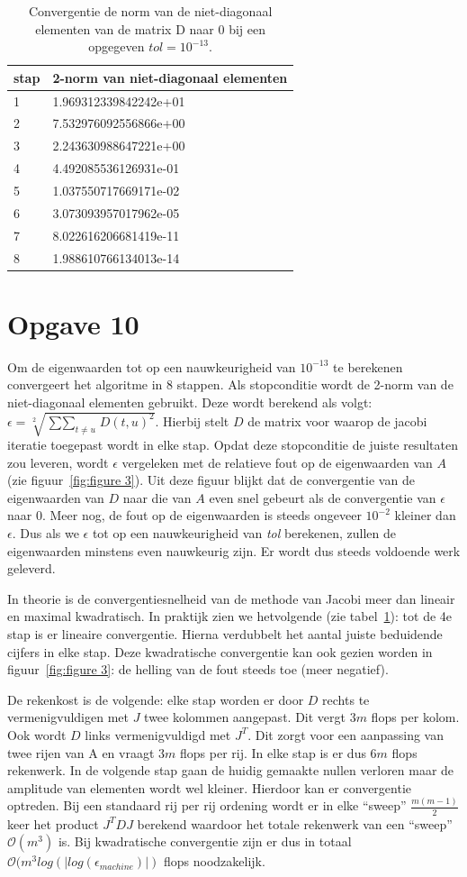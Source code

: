 \documentclass[a4paper]{article}
\newcommand{\opgave}[1]{\section*{Opgave #1}}
\begin{document}
\begin{table}[h]
\begin{tabular}{|l|l|}
\hline
stap & 2-norm van niet-diagonaal elementen\\
\hline
1 & 1.969312339842242e+01\\
2 & 7.532976092556866e+00\\
3 & 2.243630988647221e+00\\
4 & 4.492085536126931e-01\\
5 & 1.037550717669171e-02\\
6 & 3.073093957017962e-05\\
7 & 8.022616206681419e-11\\
8 & 1.988610766134013e-14\\
\hline
\end{tabular}
\caption{Convergentie de norm van de niet-diagonaal elementen van de matrix D naar 0 bij een opgegeven $tol =10^{-13}$.}
\label{table:tab2}
\end{table}
\newpage
\opgave{10}
Om de eigenwaarden tot op een nauwkeurigheid van $10^{-13}$ te berekenen convergeert het algoritme in 8 stappen. Als stopconditie wordt de 2-norm van de niet-diagonaal elementen gebruikt. Deze wordt berekend als volgt: $\epsilon = \sqrt[2]{\mathop{\sum\sum}_{t\neq u} D(t,u)^2}$. Hierbij stelt $D$ de matrix voor waarop de jacobi iteratie toegepast wordt in elke stap. Opdat deze stopconditie de juiste resultaten zou leveren, wordt $\epsilon$ vergeleken met de relatieve fout op de eigenwaarden van $A$ (zie figuur~\ref{fig:figure 3}). Uit deze figuur blijkt dat de convergentie van de eigenwaarden van $D$ naar die van $A$ even snel gebeurt als de convergentie van $\epsilon$ naar 0. Meer nog, de fout op de eigenwaarden is steeds ongeveer $10^{-2}$ kleiner dan $\epsilon$. Dus als we $\epsilon$ tot op een nauwkeurigheid van \textit{tol} berekenen, zullen de eigenwaarden minstens even nauwkeurig zijn. Er wordt dus steeds voldoende werk geleverd.

In theorie is de convergentiesnelheid van de methode van Jacobi meer dan lineair en maximal kwadratisch. In praktijk zien we hetvolgende (zie tabel~\ref{table:tab2}): tot de 4e stap is er lineaire convergentie. Hierna verdubbelt het aantal juiste beduidende cijfers in elke stap. Deze kwadratische convergentie kan ook gezien worden in figuur~\ref{fig:figure 3}: de helling van de fout steeds toe (meer negatief).

De rekenkost is de volgende: elke stap worden er door $D$ rechts te vermenigvuldigen met $J$ twee kolommen aangepast. Dit vergt $3m$   flops per kolom. Ook wordt $D$ links vermenigvuldigd met $J^{T}$.  Dit zorgt voor een aanpassing van twee rijen van A en vraagt $3m$ flops per rij. In elke stap is er dus $6m$ flops rekenwerk. In de volgende stap gaan de huidig gemaakte nullen verloren maar de amplitude van elementen wordt wel kleiner. Hierdoor kan er convergentie optreden. Bij een standaard rij per rij ordening wordt er in elke “sweep” $\frac{m(m-1)}{2}$ keer het product $J^{T}D J$ berekend waardoor het totale rekenwerk van een “sweep” $\mathcal{O}(m^{3})$ is. Bij kwadratische convergentie zijn er dus in totaal $\mathcal{O}(m^{3}log(|log(\epsilon_{machine})|)$ flops noodzakelijk.
\end{document}
